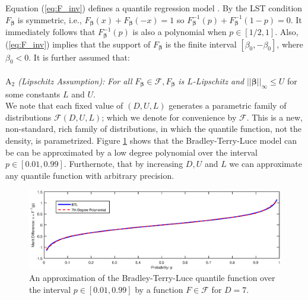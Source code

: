 \documentclass[twoside,11pt]{article}
\begin{document}
Equation (\ref{eq:F_inv}) defines a quantile regression  model \citep{takeuchi, su}. By the LST condition $F_{\boldsymbol{\beta}}$ is symmetric, i.e., $F_{\boldsymbol{\beta}}(x) + F_{\boldsymbol{\beta}}(-x) = 1$ so $F_{\boldsymbol{\beta}}^{-1}(p) +  F_{\boldsymbol{\beta}}^{-1}(1-p) = 0$. It immediately follows that $F^{-1}_{\boldsymbol{\beta}}(p)$ is also a polynomial when $p \in [1/2,1]$. Also, (\ref{eq:F_inv}) implies that the support of $F_{\boldsymbol{\beta}}$ is the finite interval $[\beta_0,-\beta_0]$, where $\beta_0 < 0$. It is further assumed that:\\
\\
\textit{$\mathrm{A}_2$ (Lipschitz Assumption): }\textit{ For all} $F_{\boldsymbol{\beta}} \in \mathcal{F}, F_{\boldsymbol{\beta}}$\textit{ is $L$-Lipschitz and  }$ ||\boldsymbol{\beta}||_{\infty} \leq U$ for some constants $L$ and $U$.\\

We note that each fixed value of $(D,U,L)$ generates a parametric family of distributions $\mathcal{F}(D,U,L)$; which we denote for convenience by $\mathcal{F}$. This is a new, non-standard, rich family of distributions, in which the quantile function, not the density, is parametrized. Figure \ref{fig:BTL_polyfit} shows that the Bradley-Terry-Luce model can be can be approximated by a low degree polynomial over the interval $p\in[0.01, 0.99]$. Furthernote, that by increasing $D,U$ and $L$ we can approximate any quantile function with arbitrary precision. 

\begin{figure}
  \centering
    \includegraphics[width=1\textwidth]{BTL_polynomial_approx.eps}
    \caption{An  approximation of the Bradley-Terry-Luce quantile function over the interval $p\in[0.01, 0.99]$ by a function $F\in \mathcal{F}$ for $D = 7$. \label{fig:BTL_polyfit}}
\end{figure}
\end{document}
